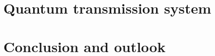 \documentclass[
	a4paper,
	parskip,
	appendixprefix,
	chapterprefix,
	headings=big,
]{scrreprt}
\theoremstyle{definition}
\theoremstyle{remark}
\numberwithin{equation}{section}
\begin{document}
	\chapter{Quantum transmission system}
	\begin{refsection}
		
		
		
		\printbibliography[title=References]
	\end{refsection}

	\chapter{Conclusion and outlook}
	\begin{refsection}
		
		

		\addcontentsline{toc}{section}{References}
		\printbibliography[title=References]
	\end{refsection}

	\appendix
	
%		
%		
%		
%		
%		
%		
		
%		
\end{document}
